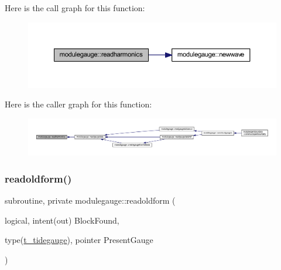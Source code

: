 Here is the call graph for this function\+:\nopagebreak
\begin{figure}[H]
\begin{center}
\leavevmode
\includegraphics[width=350pt]{namespacemodulegauge_a9095cfa51e7b4150e1d3889efe30b265_cgraph}
\end{center}
\end{figure}
Here is the caller graph for this function\+:\nopagebreak
\begin{figure}[H]
\begin{center}
\leavevmode
\includegraphics[width=350pt]{namespacemodulegauge_a9095cfa51e7b4150e1d3889efe30b265_icgraph}
\end{center}
\end{figure}
\mbox{\label{namespacemodulegauge_a046651f5fe7a0df46688f6d3467b09b5}} 
\subsubsection{\texorpdfstring{readoldform()}{readoldform()}}
{\footnotesize\ttfamily subroutine, private modulegauge\+::readoldform (\begin{DoxyParamCaption}\item[{logical, intent(out)}]{Block\+Found,  }\item[{type(\mbox{\hyperlink{structmodulegauge_1_1t__tidegauge}{t\+\_\+tidegauge}}), pointer}]{Present\+Gauge }\end{DoxyParamCaption})\hspace{0.3cm}{\ttfamily [private]}}

